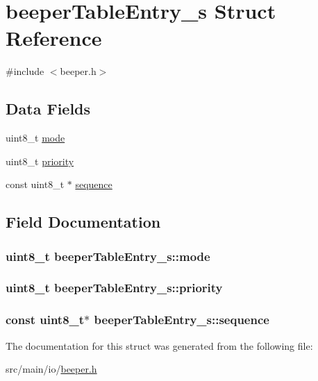 \hypertarget{structbeeperTableEntry__s}{\section{beeper\+Table\+Entry\+\_\+s Struct Reference}
\label{structbeeperTableEntry__s}
}


{\ttfamily \#include $<$beeper.\+h$>$}

\subsection*{Data Fields}
\begin{DoxyCompactItemize}
\item 
uint8\+\_\+t \hyperlink{structbeeperTableEntry__s_afb516b9e6e1b8361001a166953dd8c4e}{mode}
\item 
uint8\+\_\+t \hyperlink{structbeeperTableEntry__s_ac8fd61d4f092226b25bc9b8eae09b13e}{priority}
\item 
const uint8\+\_\+t $\ast$ \hyperlink{structbeeperTableEntry__s_a1ee2c3afbf5ed6b64b6094fa349d490c}{sequence}
\end{DoxyCompactItemize}


\subsection{Field Documentation}
\hypertarget{structbeeperTableEntry__s_afb516b9e6e1b8361001a166953dd8c4e}{
\subsubsection[{mode}]{\setlength{\rightskip}{0pt plus 5cm}uint8\+\_\+t beeper\+Table\+Entry\+\_\+s\+::mode}}\label{structbeeperTableEntry__s_afb516b9e6e1b8361001a166953dd8c4e}
\hypertarget{structbeeperTableEntry__s_ac8fd61d4f092226b25bc9b8eae09b13e}{
\subsubsection[{priority}]{\setlength{\rightskip}{0pt plus 5cm}uint8\+\_\+t beeper\+Table\+Entry\+\_\+s\+::priority}}\label{structbeeperTableEntry__s_ac8fd61d4f092226b25bc9b8eae09b13e}
\hypertarget{structbeeperTableEntry__s_a1ee2c3afbf5ed6b64b6094fa349d490c}{
\subsubsection[{sequence}]{\setlength{\rightskip}{0pt plus 5cm}const uint8\+\_\+t$\ast$ beeper\+Table\+Entry\+\_\+s\+::sequence}}\label{structbeeperTableEntry__s_a1ee2c3afbf5ed6b64b6094fa349d490c}


The documentation for this struct was generated from the following file\+:\begin{DoxyCompactItemize}
\item 
src/main/io/\hyperlink{beeper_8h}{beeper.\+h}\end{DoxyCompactItemize}
